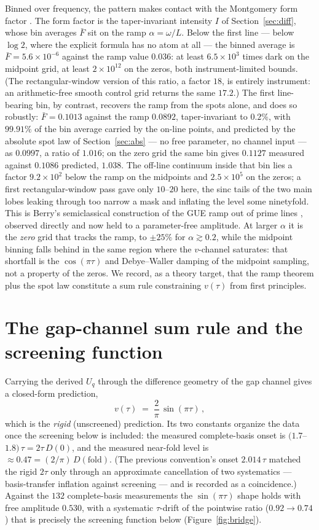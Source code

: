 \documentclass[12pt]{amsart}
\begin{document}
Binned over frequency, the pattern makes contact with the Montgomery
form factor \cite{Montgomery73}. The form factor is the taper-invariant
intensity $I$ of Section~\ref{sec:diff}, whose bin averages
$\bar F$ sit on the ramp $\alpha = \omega/L$. Below the first line --- below $\log 2$, where the explicit formula has
no atom at all --- the binned average is
$\bar F = 5.6\times10^{-6}$ against the ramp value $0.036$: at least
$6.5\times10^{3}$ times dark on the midpoint grid, at least
$2\times10^{12}$ on the zeros, both instrument-limited bounds. (The
rectangular-window version of this ratio, a factor $18$, is entirely
instrument: an arithmetic-free smooth control grid returns the same
$17.2$.) The first line-bearing bin, by contrast, recovers the ramp
from the spots alone, and does so robustly: $\bar F = 0.1013$ against
the ramp $0.0892$, taper-invariant to $0.2\%$, with $99.91\%$ of the
bin average carried by the on-line points, and predicted by the
absolute spot law of Section~\ref{sec:abs} --- no free parameter, no
channel input --- as $0.0997$, a ratio of $1.016$; on the zero grid the
same bin gives $0.1127$ measured against $0.1086$ predicted, $1.038$.
The off-line continuum inside that bin lies a factor $9.2\times10^{2}$
below the ramp on the midpoints and $2.5\times10^{5}$ on the zeros; a
first rectangular-window pass gave only $10$--$20$ here, the sinc tails
of the two main lobes leaking through too narrow a mask and inflating
the level some ninetyfold. This is
Berry's semiclassical construction of the GUE ramp out of prime lines
\cite{Berry88}, observed directly and now held to a parameter-free
amplitude. At larger $\alpha$ it is the \emph{zero} grid that tracks
the ramp, to $\pm 25\%$ for $\alpha \gtrsim 0.2$, while the midpoint
binning falls behind in the same region where the $v$-channel
saturates: that shortfall is the $\cos(\pi\tau)$ and Debye--Waller
damping of the midpoint sampling, not a property of the zeros. We
record, as a theory target, that the ramp theorem plus the spot law
constitute a sum rule constraining $v(\tau)$ from first principles.

\section{The gap-channel sum rule and the screening function}
\label{sec:gap}

Carrying the derived $U_q$ through the difference geometry of the gap
channel gives a closed-form prediction,
\[
v(\tau) \;=\; \frac{2}{\pi}\,\sin(\pi\tau)\, ,
\]
which is the \emph{rigid} (unscreened) prediction. Its two constants
organize the data once the screening below is included: the measured
complete-basis onset is $(1.7$--$1.8)\,\tau = 2\tau\,D(0)$, and the
measured near-fold level is $\approx 0.47 = (2/\pi)\,
D(\mathrm{fold})$. (The previous convention's onset $2.014\,\tau$
matched the rigid $2\tau$ only through an approximate cancellation of
two systematics --- basis-transfer inflation against screening --- and
is recorded as a coincidence.) Against the $132$ complete-basis
measurements the $\sin(\pi\tau)$ shape holds with free amplitude
$0.530$, with a systematic $\tau$-drift of the pointwise ratio
($0.92 \to 0.74$) that is precisely the screening function below
(Figure~\ref{fig:bridge}).
\end{document}
